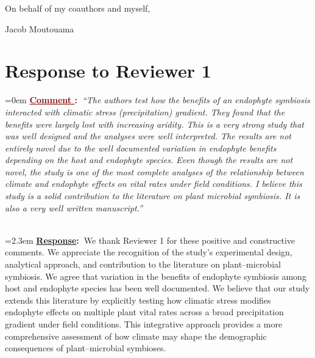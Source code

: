 \documentclass[12pt]{article}
\newcounter{cN}
\newcommand{\comment}[1]{
	\vspace{2em}
	\refstepcounter{cN} %
	\noindent \hangindent=0em \textbf{\textcolor{Maroon}{\uline{Comment \thecN}:~}}\emph{``#1''}
	}
\newcommand{\response}[1]{
	\\[0.25em]
	\hangindent=2.3em \textbf{\textcolor{NavyBlue}{\uline{Response}:~}}#1
	}
\providecommand{\uline}[1]{\underline{#1}}
\begin{document}
\vspace{2em}
\hfill On behalf of my coauthors and myself,

\hfill Jacob Moutouama
\newpage

\section{Response to Reviewer 1}
\vspace{-2em}

\comment{The authors test how the benefits of an endophyte symbiosis interacted with climatic stress (precipitation) gradient. They found that the benefits were largely lost with increasing aridity. This is a very strong study that was well designed and the analyses were well interpreted. The results are not entirely novel due to the well documented variation in endophyte benefits depending on the host and endophyte species. Even though the results are not novel, the study is one of the most complete analyses of the relationship between climate and endophyte effects on vital rates under field conditions. I believe this study is a solid contribution to the literature on plant microbial symbiosis. It is also a very well written manuscript.}
\response{We thank Reviewer 1 for these positive and constructive comments. We appreciate the recognition of the study’s experimental design, analytical approach, and contribution to the literature on plant–microbial symbiosis. We agree that variation in the benefits of endophyte symbiosis among host and endophyte species has been well documented. We believe that our study extends this literature by explicitly testing how climatic stress modifies endophyte effects on multiple plant vital rates across a broad precipitation gradient under field conditions. This integrative approach provides a more comprehensive assessment of how climate may shape the demographic consequences of plant–microbial symbioses.}
\end{document}
